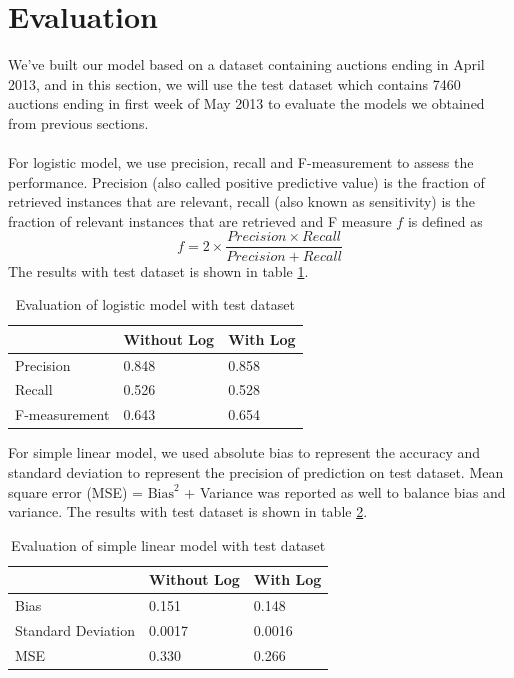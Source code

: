 \documentclass[CEJM,PDF]{cej} %
\begin{document}
\section{Evaluation}
We've built our model based on a dataset containing auctions ending in April 2013, and in this section, we will use the test dataset which contains 7460 auctions ending in first week of May 2013 to evaluate the models we obtained from previous sections. \\
\\
For logistic model, we use precision, recall and F-measurement to assess the performance. Precision (also called positive predictive value) is the fraction of retrieved instances that are relevant, recall (also known as sensitivity) is the fraction of relevant instances that are retrieved and F measure $f$ is defined as 
$$f=2\times\frac{Precision\times Recall}{Precision+Recall}$$
The results with test dataset is shown in table \ref{logit}.

\begin{table}[h]
\centering
\caption{Evaluation of logistic model with test dataset}
\label{logit}
\begin{tabular}{@{}|l|l|l|@{}}
\toprule
\hline
  & Without Log & With Log \\
\hline
Precision  & 0.848 & 0.858 \\ \midrule
\hline
Recall  & 0.526 & 0.528  \\
\hline
F-measurement  &  0.643 & 0.654\\ \bottomrule
\hline
\end{tabular}
\end{table}


For simple linear model, we used absolute bias to represent the accuracy and standard deviation to represent the precision of prediction on test dataset. Mean square error (MSE) = $\text{Bias}^2$ + Variance was reported as well to balance bias and variance. The results with test dataset is shown in table \ref{lm}.

\begin{table}[h]
\centering
\caption{Evaluation of simple linear model with test dataset}
\label{lm}
\begin{tabular}{@{}|l|l|l|@{}}
\toprule
\hline
  & Without Log & With Log \\
\hline
Bias  & 0.151  & 0.148 \\ \midrule
\hline
Standard Deviation  &  0.0017 & 0.0016  \\
\hline
MSE  &  0.330  & 0.266\\ \bottomrule
\hline
\end{tabular}
\end{table}
\end{document}
